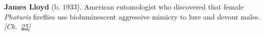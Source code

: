 \textbf{James Lloyd} (b. 1933). American entomologist who discovered that female \emph{Photuris} fireflies use bioluminescent aggressive mimicry to lure and devour males. \emph{[Ch.~\hyperref[ch:fireflybioluminescence]{25}]}

